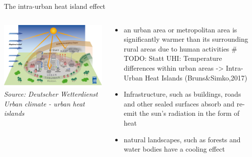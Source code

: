 \begin{frame}{The intra-urban heat island effect}
	\begin{columns}[T] %
		\begin{column}{.52\textwidth}
			\includegraphics[width=\linewidth]{../writeup/images/urbanheatisland_01.png}\\
			\textit{\footnotesize Source: Deutscher Wetterdienst\\Urban climate - urban heat islands}
		\end{column}%
		\hfill%
		\begin{column}{.48\textwidth}
			\begin{itemize}
				\item \glqq{}{[\textellipsis]} an urban area or metropolitan area is significantly warmer than its surrounding rural areas due to human activities\grqq{}\cite{takebayashi_chapter_2020}
				# TODO: Statt UHI: Temperature differences within urban areas -> Intra-Urban Heat Islands (Bruns&Simko,2017)
				\item Infrastructure, such as buildings, roads and other sealed surfaces absorb and re-emit the sun's radiation in the form of heat
				\item natural landscapes, such as forests and water bodies have a cooling effect\cite{us_epa_learn_2014}
			\end{itemize}
		\end{column}%
	\end{columns}
\end{frame}
